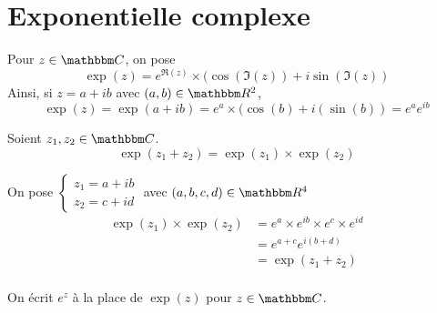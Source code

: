\part{Exponentielle complexe}

\begin{defn}
	Pour $z \in \C$, on pose \[
		\exp(z) = e^{\Re(z)}\times (\cos(\Im(z))+i\sin(\Im(z))
	\] Ainsi, si $z = a+ib$ avec $(a,b)\in \R^2$, \[
		\exp(z) = \exp(a+ib) = e^{a}\times (\cos(b)+i(\sin(b)) = e^{a}e^{ib}
	\] 
\end{defn}

\begin{prop}
	Soient $z_1, z_2 \in \C$. \[
		\exp(z_1+z_2) = \exp(z_1)\times \exp(z_2)
	\] 
\end{prop}

\begin{prv}
	On pose $\begin{cases}
		z_1 = a+ib\\
		z_2 = c+id
	\end{cases}$ avec $(a,b,c,d)\in \R^4$ \\
	\begin{align*}
		\exp(z_1)\times \exp(z_2) &= e^{a}\times e^{ib}\times e^{c}\times e^{id} \\
		&= e^{a+c}e^{i(b+d)} \\
		&= \exp(z_1+z_2) \\
	\end{align*}
\end{prv}

\begin{rmk}
	[Notation]
	On écrit $e^{z}$ à la place de $\exp(z)$ pour $z \in \C$.
\end{rmk}

